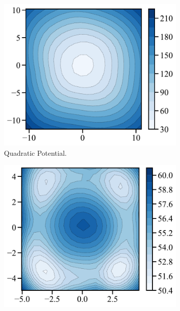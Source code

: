 \begin{figure}[t]
     \centering
     \begin{subfigure}[t]{0.21\textwidth}
         \centering
         \includegraphics[width=\textwidth]{figures/fig_energy_implicit_quadratic.pdf}
         \caption{Quadratic \protect\newline Potential.}
     \end{subfigure}
     \hfill
     \begin{subfigure}[t]{0.21\textwidth}
         \centering
         \includegraphics[width=\textwidth]{figures/fig_energy_implicit_styblinski.pdf}

\end{subfigure}
\end{figure}
